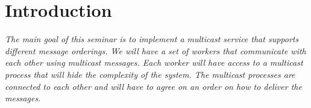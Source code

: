 \section{Introduction}

\textit{The main goal of this seminar is to implement a multicast service that supports different message orderings.
\newline We will have a set of workers that communicate with each other using multicast messages. Each worker will have access to a multicast process that will hide the complexity of the system. The multicast processes are connected to each other and will have to agree on an order on how to deliver the messages.}